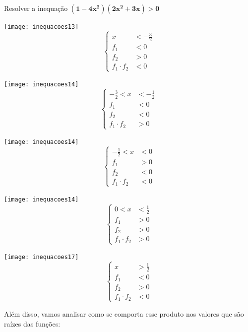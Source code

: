 \begin{example}{Resolver a inequação $\bm{(1-4x^2)(2x^2+3x)>0}$}
\begin{multicols}{5}
\centering

\texttt{[image: inequacoes13]}
\begin{equation*}
\left \{
\begin{aligned}
x&<-\frac{3}{2}\\
f_1&<0\\
f_2&>0\\
f_1\cdot f_2&<0
\end{aligned}
\right.
\end{equation*}


\texttt{[image: inequacoes14]}
\begin{equation*}
\left \{
\begin{aligned}
-\frac{3}{2}<x&<-\frac{1}{2}\\
f_1&<0\\
f_2&<0\\
f_1\cdot f_2&>0
\end{aligned}
\right.
\end{equation*}


\texttt{[image: inequacoes14]}
\begin{equation*}
\left \{
\begin{aligned}
-\frac{1}{2}<x&<0\\
f_1&>0\\
f_2&<0\\
f_1\cdot f_2&<0
\end{aligned}
\right.
\end{equation*}



\texttt{[image: inequacoes14]}
\begin{equation*}
\left \{
\begin{aligned}
0<x&<\frac{1}{2}\\
f_1&>0\\
f_2&>0\\
f_1\cdot f_2&>0
\end{aligned}
\right.
\end{equation*}


\texttt{[image: inequacoes17]}
\begin{equation*}
\left \{
\begin{aligned}
x&>\frac{1}{2}\\
f_1&<0\\
f_2&>0\\
f_1\cdot f_2&<0
\end{aligned}
\right.
\end{equation*}
\end{multicols}
Além disso, vamos analisar como se comporta esse produto nos valores que são raízes das funções:


\end{example}
